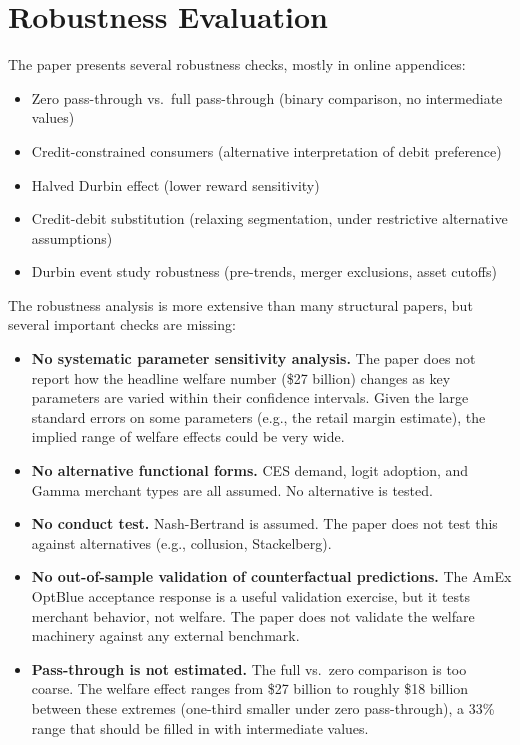 \documentclass[11pt]{article}
\begin{document}
\section{Robustness Evaluation}

The paper presents several robustness checks, mostly in online appendices:

\begin{itemize}[leftmargin=*]
    \item Zero pass-through vs.\ full pass-through (binary comparison, no intermediate values)
    \item Credit-constrained consumers (alternative interpretation of debit preference)
    \item Halved Durbin effect (lower reward sensitivity)
    \item Credit-debit substitution (relaxing segmentation, under restrictive alternative assumptions)
    \item Durbin event study robustness (pre-trends, merger exclusions, asset cutoffs)
\end{itemize}

The robustness analysis is more extensive than many structural papers, but several important checks are missing:

\begin{itemize}[leftmargin=*]
    \item \textbf{No systematic parameter sensitivity analysis.} The paper does not report how the headline welfare number (\$27 billion) changes as key parameters are varied within their confidence intervals. Given the large standard errors on some parameters (e.g., the retail margin estimate), the implied range of welfare effects could be very wide.
    \item \textbf{No alternative functional forms.} CES demand, logit adoption, and Gamma merchant types are all assumed. No alternative is tested.
    \item \textbf{No conduct test.} Nash-Bertrand is assumed. The paper does not test this against alternatives (e.g., collusion, Stackelberg).
    \item \textbf{No out-of-sample validation of counterfactual predictions.} The AmEx OptBlue acceptance response is a useful validation exercise, but it tests merchant behavior, not welfare. The paper does not validate the welfare machinery against any external benchmark.
    \item \textbf{Pass-through is not estimated.} The full vs.\ zero comparison is too coarse. The welfare effect ranges from \$27 billion to roughly \$18 billion between these extremes (one-third smaller under zero pass-through), a 33\% range that should be filled in with intermediate values.
\end{itemize}
\end{document}
